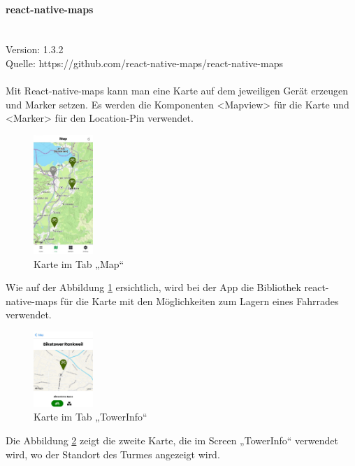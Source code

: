 \paragraph{react-native-maps}\mbox{}\\
Version: 1.3.2\\
Quelle: https://github.com/react-native-maps/react-native-maps\\ \\
Mit React-native-maps kann man eine Karte auf dem jeweiligen Gerät erzeugen und Marker setzen. Es werden die Komponenten <Mapview> für die Karte und <Marker> für den \Gls{Location-Pin} verwendet.  \\
\begin{figure}[H]
  \centering
  \includegraphics[width=0.2\textwidth]{images/app-screenshots/tabmap.jpg}
  \caption{Karte im Tab „Map“}
  \label{fig:tabmap}
\end{figure}
Wie auf der Abbildung \ref*{fig:tabmap} ersichtlich, wird bei der App die Bibliothek react-native-maps für die Karte mit den Möglichkeiten zum Lagern eines Fahrrades verwendet. \\
\begin{figure}[H]
  \centering
  \includegraphics[width=0.2\textwidth]{images/app-screenshots/smallmap.png}
  \caption{Karte im Tab „TowerInfo“}
  \label{fig:smallmap}
\end{figure}
Die Abbildung \ref{fig:smallmap} zeigt die zweite Karte, die im Screen „TowerInfo“ verwendet wird, wo der Standort des Turmes angezeigt wird.\\


